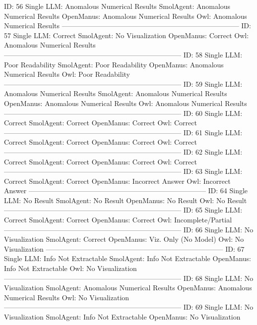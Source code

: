 \begin{tcolorbox}[colback=cadmiumgreen!5!white,colframe=forestgreen!75!white,breakable,title=\textit{Human evaluation results in task 4.}]
\begin{VerbatimWrap}
ID: 56 
Single LLM: Anomalous Numerical Results 
SmolAgent: Anomalous Numerical Results 
OpenManus: Anomalous Numerical Results 
Owl: Anomalous Numerical Results 
-----------------------------------------------------------------------------
ID: 57 
Single LLM: Correct 
SmolAgent: No Visualization 
OpenManus: Correct 
Owl: Anomalous Numerical Results 
-----------------------------------------------------------------------------
ID: 58 
Single LLM: Poor Readability 
SmolAgent: Poor Readability 
OpenManus: Anomalous Numerical Results 
Owl: Poor Readability 
-----------------------------------------------------------------------------
ID: 59 
Single LLM: Anomalous Numerical Results 
SmolAgent: Anomalous Numerical Results 
OpenManus: Anomalous Numerical Results 
Owl: Anomalous Numerical Results 
-----------------------------------------------------------------------------
ID: 60 
Single LLM: Correct 
SmolAgent: Correct 
OpenManus: Correct 
Owl: Correct 
-----------------------------------------------------------------------------
ID: 61 
Single LLM: Correct 
SmolAgent: Correct 
OpenManus: Correct 
Owl: Correct 
-----------------------------------------------------------------------------
ID: 62 
Single LLM: Correct 
SmolAgent: Correct 
OpenManus: Correct 
Owl: Correct 
-----------------------------------------------------------------------------
ID: 63 
Single LLM: Correct 
SmolAgent: Correct 
OpenManus: Incorrect Answer 
Owl: Incorrect Answer 
-----------------------------------------------------------------------------
ID: 64 
Single LLM: No Result 
SmolAgent: No Result 
OpenManus: No Result 
Owl: No Result 
-----------------------------------------------------------------------------
ID: 65 
Single LLM: Correct 
SmolAgent: Correct 
OpenManus: Correct 
Owl: Incomplete/Partial 
-----------------------------------------------------------------------------
ID: 66 
Single LLM: No Visualization 
SmolAgent: Correct 
OpenManus: Viz. Only (No Model) 
Owl: No Visualization 
-----------------------------------------------------------------------------
ID: 67 
Single LLM: Info Not Extractable 
SmolAgent: Info Not Extractable 
OpenManus: Info Not Extractable 
Owl: No Visualization 
-----------------------------------------------------------------------------
ID: 68 
Single LLM: No Visualization 
SmolAgent: Anomalous Numerical Results 
OpenManus: Anomalous Numerical Results 
Owl: No Visualization 
-----------------------------------------------------------------------------
ID: 69 
Single LLM: No Visualization 
SmolAgent: Info Not Extractable 
OpenManus: No Visualization 

\end{VerbatimWrap}
\end{tcolorbox}
